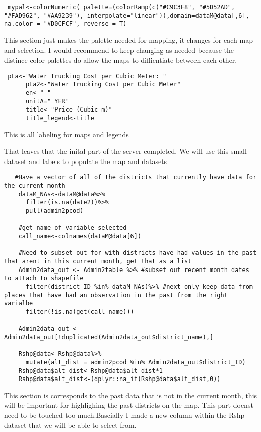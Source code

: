 \documentclass[
]{article}
\begin{document}
\begin{verbatim}
 mypal<-colorNumeric( palette=(colorRamp(c("#C9C3F8", "#5D52AD", "#FAD962", "#AA9239"), interpolate="linear")),domain=dataM@data[,6], na.color = "#D0CFCF", reverse = T)
\end{verbatim}

This section just makes the palette needed for mapping, it changes for
each map and selection. I would recommend to keep changing as needed
because the distince color palettes do allow the maps to diffientiate
between each other.

\begin{verbatim}
 pLa<-"Water Trucking Cost per Cubic Meter: "
      pLa2<-"Water Trucking Cost per Cubic Meter"
      en<-" "
      unitA=" YER"
      title<-"Price (Cubic m)"
      title_legend<-title
\end{verbatim}

This is all labeling for maps and legends

That leaves that the inital part of the server completed. We will use
this small dataset and labels to populate the map and datasets

\begin{verbatim}
   #Have a vector of all of the districts that currently have data for the current month
    dataM_NAs<-dataM@data%>%
      filter(is.na(date2))%>%
      pull(admin2pcod)
    
    #get name of variable selected
    call_name<-colnames(dataM@data[6])
    
    #Need to subset out for with districts have had values in the past that arent in this current month, get that as a list
    Admin2data_out <- Admin2table %>% #subset out recent month dates to attach to shapefile
      filter(district_ID %in% dataM_NAs)%>% #next only keep data from places that have had an observation in the past from the right varialbe
      filter(!is.na(get(call_name)))
    
    Admin2data_out <- Admin2data_out[!duplicated(Admin2data_out$district_name),]
    
    Rshp@data<-Rshp@data%>%
      mutate(alt_dist = admin2pcod %in% Admin2data_out$district_ID)
    Rshp@data$alt_dist<-Rshp@data$alt_dist*1
    Rshp@data$alt_dist<-(dplyr::na_if(Rshp@data$alt_dist,0))
\end{verbatim}

This section is corresponds to the past data that is not in the current
month, this will be important for highlighing the past districts on the
map. This part doenst need to be touched too much.Bascially I made a new
column within the Rshp dataset that we will be able to select from.
\end{document}
